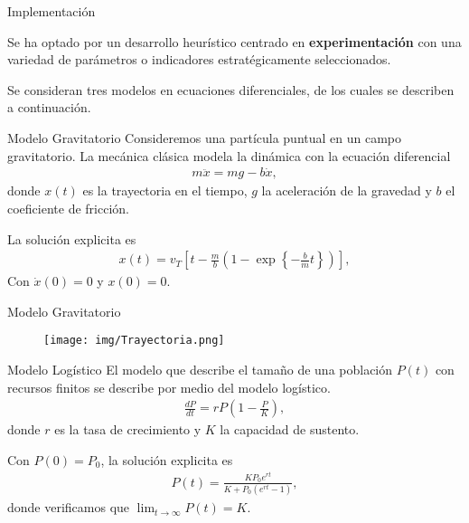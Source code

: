 \documentclass[10pt,aspectratio=169]{beamer}
\begin{document}
\begin{frame}{Implementación}

  Se ha optado por un desarrollo heurístico centrado en \textbf{experimentación} con una variedad de parámetros o indicadores estratégicamente seleccionados.

  \vspace{0.5 cm}

  Se consideran tres modelos en ecuaciones diferenciales, de los cuales se describen a continuación.
\end{frame}


\begin{frame}{Modelo Gravitatorio}
  Consideremos una partícula puntual en un campo gravitatorio. La mecánica clásica modela la dinámica con la ecuación diferencial
  \begin{align}
    m \ddot{x} = mg - b\dot{x},
    \label{3.1.03}
  \end{align}
  donde $x(t)$ es la trayectoria en el tiempo, $g$ la aceleración de la gravedad y $b$ el coeficiente de fricción.

  La solución explicita es
  \begin{align}
    x(t) = v_T \left [ t - \frac{m}{b} \left( 1- \exp\left\{-\frac{b}{m} t\right\}\right)\right],
    \label{3.1.12}
  \end{align}
  Con $\dot{x}(0)=0$ y $x(0) = 0$.
\end{frame}


\begin{frame}{Modelo Gravitatorio}
  \begin{figure}
    \centering
    \texttt{[image: img/Trayectoria.png]}
    \label{fig:trayectoria_gravedad}
  \end{figure}
\end{frame}

\begin{frame}{Modelo Logístico}
  El modelo que describe el tamaño de una población $P(t)$ con recursos finitos se describe por medio del modelo logístico. 
  \begin{align}
    \frac{dP}{dt} = rP\left(1- \frac{P}{K}  \right),
    \label{3.1.2.03}
  \end{align}
  donde $r$ es la tasa de crecimiento y $K$ la capacidad de sustento.
  
  Con $P(0) = P_0$, la solución explicita es
  \begin{align}
      P(t) = \frac{KP_0 e^{rt}}{K + P_0 \left(e^{rt}-1\right)},    
      \label{3.1.2.05}
  \end{align}
  donde verificamos que $\lim_{t \rightarrow \infty}P(t) = K $. 
\end{frame}
\end{document}
